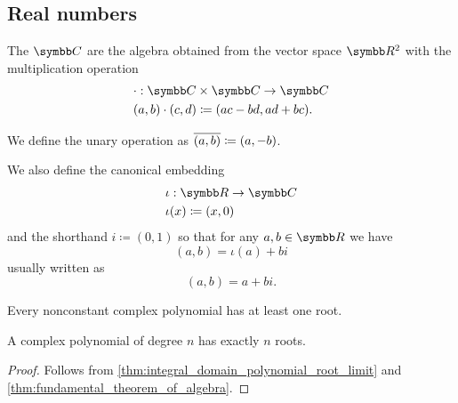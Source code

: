 \subsection{Real numbers}\label{subsec:real_numbers}

\begin{definition}\label{def:complex_numbers}
  The  \( \Co \) are the algebra obtained from the vector space \( \R^2 \) with the multiplication operation
  \begin{align*}
    &\cdot: \Co \times \Co \to \Co \\
    &(a, b) \cdot (c, d) \coloneqq (ac - bd, ad + bc).
  \end{align*}

  We define the unary  operation as \( \overline{(a, b)} \coloneqq (a, -b) \).

  We also define the canonical embedding
  \begin{align*}
    &\iota: \R \to \Co \\
    &\iota(x) \coloneqq (x, 0)
  \end{align*}
  and the shorthand \( i \coloneqq (0, 1) \) so that for any \( a, b \in \R \) we have
  \begin{equation*}
    (a, b) = \iota(a) + bi
  \end{equation*}
  usually written as
  \begin{equation*}
    (a, b) = a + bi.
  \end{equation*}
\end{definition}

\begin{theorem}\label{thm:fundamental_theorem_of_algebra}
  Every nonconstant complex polynomial has at least one root.
\end{theorem}

\begin{corollary}\label{thm:complex_polynomials_have_n_roots}
  A complex polynomial of degree \( n \) has exactly \( n \) roots.
\end{corollary}
\begin{proof}
  Follows from \cref{thm:integral_domain_polynomial_root_limit} and \cref{thm:fundamental_theorem_of_algebra}.
\end{proof}
